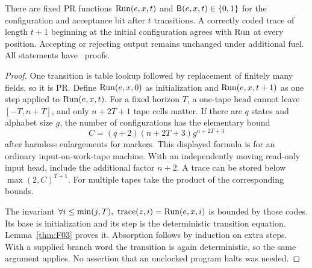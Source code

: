 \begin{theorem}\label{thm:F05}
There are fixed PR functions $\operatorname{Run}(e,x,t)$ and $\mathsf B(e,x,t)\in\{0,1\}$ for the configuration and acceptance bit after $t$ transitions. A correctly coded trace of length $t+1$ beginning at the initial configuration agrees with $\operatorname{Run}$ at every position. Accepting or rejecting output remains unchanged under additional fuel. All statements have \ipra\ proofs.
\end{theorem}
\begin{proof}
One transition is table lookup followed by replacement of finitely many fields, so it is PR. Define $\operatorname{Run}(e,x,0)$ as initialization and $\operatorname{Run}(e,x,t+1)$ as one step applied to $\operatorname{Run}(e,x,t)$. For a fixed horizon $T$, a one-tape head cannot leave $[-T,n+T]$, and only $n+2T+1$ tape cells matter. If there are $q$ states and alphabet size $g$, the number of configurations has the elementary bound
\[
 C=(q+2)(n+2T+3)g^{n+2T+3}
\]
after harmless enlargements for markers. This displayed formula is for an ordinary input-on-work-tape machine. With an independently moving read-only input head, include the additional factor $n+2$. A trace can be stored below $\max(2,C)^{T+1}$. For multiple tapes take the product of the corresponding bounds.

The invariant $\forall i\le\min(j,T),\ \operatorname{trace}(z,i)=\Run(e,x,i)$ is bounded by those codes. Its base is initialization and its step is the deterministic transition equation. Lemma~\ref{thm:F03} proves it. Absorption follows by induction on extra steps. With a supplied branch word the transition is again deterministic, so the same argument applies. No assertion that an unclocked program halts was needed.
\end{proof}

